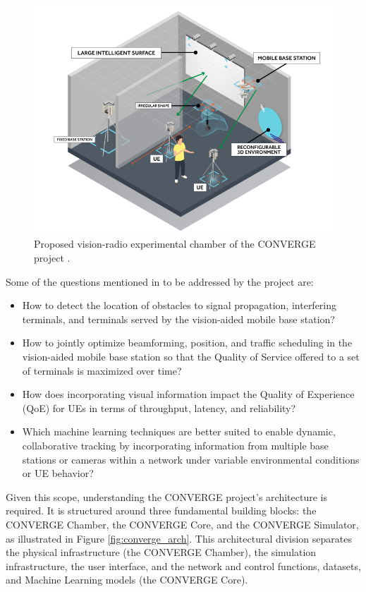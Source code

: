 \begin{figure}[H]
    \centering
    \includegraphics[width=0.7\linewidth]{figures/chamber_converge.png}
    \caption[Proposed vision-radio experimental chamber of the CONVERGE project]{Proposed vision-radio experimental chamber of the CONVERGE project \cite{converge2023_usecases}.}
    \label{fig:chamber_converge}
\end{figure}



Some of the questions mentioned in \cite{converge2023_usecases} to be addressed by the project are:

\begin{itemize}
    \item How to detect the location of obstacles to signal propagation, interfering terminals, and terminals served by the vision-aided mobile base station?
    \item How to jointly optimize beamforming, position, and traffic scheduling in the vision-aided mobile base station so that the Quality of Service offered to a set of terminals is maximized over time?
    \item How does incorporating visual information impact the Quality of Experience (QoE) for UEs in terms of throughput, latency, and reliability?
    \item Which machine learning techniques are better suited to enable dynamic, collaborative tracking by incorporating information from multiple base stations or cameras within a network under variable environmental conditions or UE behavior?
\end{itemize}

Given this scope, understanding the CONVERGE project’s architecture is required. It is
structured around three fundamental building blocks: the CONVERGE Chamber, the CONVERGE Core, and the CONVERGE Simulator, as illustrated in Figure \ref{fig:converge_arch}. This architectural division separates the physical infrastructure (the CONVERGE Chamber), the simulation infrastructure, the user interface, and the network and control functions, datasets,
and Machine Learning models (the CONVERGE Core).


